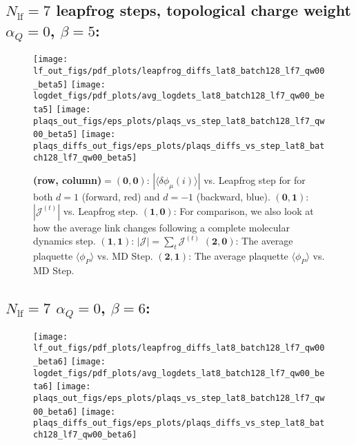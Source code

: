 \clearpage
\subsection{\texorpdfstring{$N_{\mathrm{lf}} = 7$}{Nlf = 7} leapfrog steps, topological charge weight
\texorpdfstring{$\alpha_Q = 0$}{alphaQ = 0}, \texorpdfstring{$\beta = 5$}{beta = 5}:}
%
\begin{figure}[htpb]
  \centering
  \texttt{[image: lf\_out\_figs/pdf\_plots/leapfrog\_diffs\_lat8\_batch128\_lf7\_qw00\_beta5]}
  \hfill
  \texttt{[image: logdet\_figs/pdf\_plots/avg\_logdets\_lat8\_batch128\_lf7\_qw00\_beta5]}
  \hfill
  \texttt{[image: plaqs\_out\_figs/eps\_plots/plaqs\_vs\_step\_lat8\_batch128\_lf7\_qw00\_beta5]}
  \hfill
  \texttt{[image: plaqs\_diffs\_out\_figs/eps\_plots/plaqs\_diffs\_vs\_step\_lat8\_batch128\_lf7\_qw00\_beta5]}
  \caption{%
    \textbf{(row, column)}$ = \mathbf{(0, 0)}$: $|\langle \delta\phi_{\mu}{(i)}\rangle|$ vs. Leapfrog step for for both
        $d = 1$ (forward, red) and $d = -1$ (backward, blue).%
    $\mathbf{(0, 1)}$: $|\mathcal{J}^{(t)}|$ vs. Leapfrog step.%
    $\mathbf{(1, 0)}$: For comparison, we also look at how the average link changes following a complete molecular
        dynamics step.%
    $\mathbf{(1, 1)}$: $|\mathcal{J}| = \sum_{t} \mathcal{J}^{(t)}$%
    $\mathbf{(2, 0)}$: The average plaquette $\langle \phi_{P}\rangle$ vs. MD Step.%
    $\mathbf{(2, 1)}$: The average plaquette $\langle \phi_{P}\rangle$ vs. MD Step.}
\end{figure}

%
\clearpage
\subsection{\texorpdfstring{$N_{\mathrm{lf}} = 7$}{Nlf = 7} \texorpdfstring{$\alpha_Q = 0$}{alphaQ = 0},
\texorpdfstring{$\beta = 6$}{beta = 6}:}
\begin{figure}[htpb]
  \texttt{[image: lf\_out\_figs/pdf\_plots/leapfrog\_diffs\_lat8\_batch128\_lf7\_qw00\_beta6]}
  \hfill
  \texttt{[image: logdet\_figs/pdf\_plots/avg\_logdets\_lat8\_batch128\_lf7\_qw00\_beta6]}
  \hfill
  \texttt{[image: plaqs\_out\_figs/eps\_plots/plaqs\_vs\_step\_lat8\_batch128\_lf7\_qw00\_beta6]}
  \hfill
  \texttt{[image: plaqs\_diffs\_out\_figs/eps\_plots/plaqs\_diffs\_vs\_step\_lat8\_batch128\_lf7\_qw00\_beta6]}
\end{figure}


